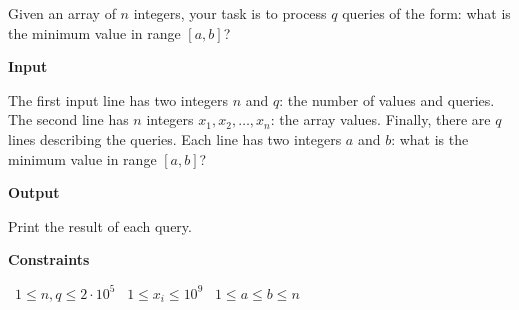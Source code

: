 Given an array of $n$ integers, your task is to process $q$ queries of the form: what is the minimum value in range $[a,b]$?

\vspace{0.3cm}\noindent\textbf{Input}

The first input line has two integers $n$ and $q$: the number of values and queries.
The second line has $n$ integers $x_1,x_2,\dots,x_n$: the array values.
Finally, there are $q$ lines describing the queries. Each line has two integers $a$ and $b$: what is the minimum value in range $[a,b]$?

\vspace{0.3cm}\noindent\textbf{Output}

Print the result of each query.

\vspace{0.3cm}\noindent\textbf{Constraints}

\textbullet\ $1 \le n,q \le 2 \cdot 10^5$
\textbullet\ $1 \le x_i \le 10^9$
\textbullet\ $1 \le a \le b \le n$